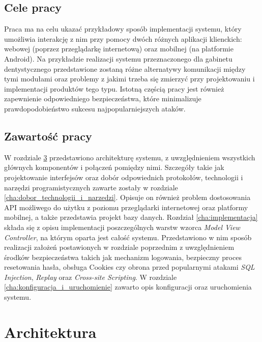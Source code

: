 \documentclass[11pt]{aghdpl}
\begin{document}
\section{Cele pracy}
\label{sec:cele_pracy}

Praca ma na celu ukazać przykładowy sposób implementacji systemu, który umożliwia interakcję z nim przy pomocy dwóch różnych aplikacji klienckich: webowej (poprzez przeglądarkę internetową) oraz mobilnej (na platformie Android). Na przykładzie realizacji systemu przeznaczonego dla gabinetu dentystycznego przedstawione zostaną różne alternatywy komunikacji między tymi modułami oraz problemy z jakimi trzeba się zmierzyć przy projektowaniu i implementacji produktów tego typu. Istotną częścią pracy jest również zapewnienie odpowiedniego bezpieczeństwa, które minimalizuje prawdopodobieństwo sukcesu najpopularniejszych ataków.

\section{Zawartość pracy}
\label{sec:zawartosc_pracy}

W rozdziale \ref{cha:architektura} przedstawiono architekturę systemu, z uwzględnieniem wszystkich głównych komponentów i połączeń pomiędzy nimi. Szczegóły takie jak projektowanie interfejsów oraz dobór odpowiednich protokołów, technologii i narzędzi programistycznych zawarte zostały w rozdziale \ref{cha:dobor_technologii_i_narzedzi}. Opisuje on również problem dostosowania API możliwego do użytku z poziomu przeglądarki internetowej oraz platformy mobilnej, a także przedstawia projekt bazy danych. Rozdział \ref{cha:implementacja} składa się z opisu implementacji poszczególnych warstw wzorca \emph{Model View Controller}, na którym oparta jest całość systemu. Przedstawiono w nim sposób realizacji założeń postawionych w rozdziale poprzednim z uwzględnieniem środków bezpieczeństwa takich jak mechanizm logowania, bezpieczny proces resetowania hasła, obsługa Cookies czy obrona przed popularnymi atakami \emph{SQL Injection}, \emph{Replay} oraz \emph{Cross-site Scripting}. W rozdziale \ref{cha:konfiguracja_i_uruchomienie} zawarto opis konfiguracji oraz uruchomienia systemu.


\chapter{Architektura}
\label{cha:architektura}
\end{document}
